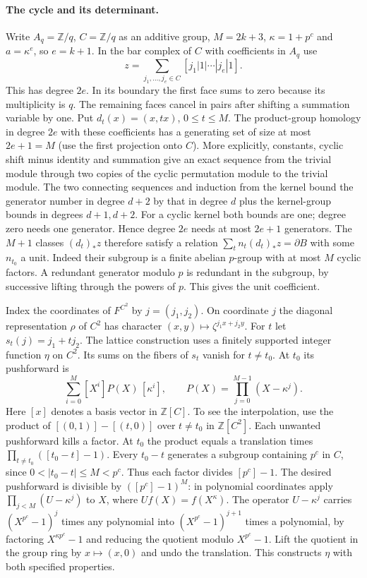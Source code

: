 \paragraph{The cycle and its determinant.}\label{kone:cycle}
Write $A_q=\mathbb Z/q$, $C=\mathbb Z/q$ as an additive group,
$M=2k+3$, $\kappa=1+p^c$ and $a=\kappa^e$, so $e=k+1$.
In the bar complex of $C$ with coefficients in $A_q$ use
\[
 z=\sum_{j_1,\ldots,j_e\in C}[j_1|1|\cdots|j_e|1].
\]
This has degree $2e$. In its boundary the first face sums to zero
because its multiplicity is $q$. The remaining faces cancel in pairs
after shifting a summation variable by one. Put $d_t(x)=(x,tx)$,
$0\le t\le M$. The product-group homology in degree $2e$ with these
coefficients has a generating set of size at most $2e+1=M$ (use the
first projection onto $C$). More explicitly, constants, cyclic
shift minus identity and summation give an exact sequence
from the trivial module through two copies of the cyclic permutation
module to the trivial module. The two connecting sequences and
induction from the kernel bound the generator number in degree $d+2$
by that in degree $d$ plus the kernel-group bounds in degrees $d+1,d+2$.
For a cyclic kernel both bounds are one; degree zero needs one
generator. Hence degree $2e$ needs at most $2e+1$ generators.
The $M+1$ classes $(d_t)_*z$
therefore satisfy a relation $\sum_t n_t(d_t)_*z=\partial B$ with
some $n_{t_0}$ a unit. Indeed their subgroup is a finite abelian
$p$-group with at most $M$ cyclic factors. A redundant generator
modulo $p$ is redundant in the subgroup, by successive lifting
through the powers of $p$. This gives the unit coefficient.

Index the coordinates of $F^{C^2}$ by $j=(j_1,j_2)$.
On coordinate $j$ the diagonal representation $\rho$ of $C^2$
has character $(x,y)\mapsto\zeta^{j_1x+j_2y}$. For $t$ let
$s_t(j)=j_1+tj_2$. The lattice construction uses a finitely supported
integer function $\eta$ on $C^2$. Its sums on the fibers of $s_t$
vanish for $t\ne t_0$. At $t_0$ its pushforward is
\[
 \sum_{i=0}^{M}[X^i]P(X)\,[\kappa^i],\qquad
 P(X)=\prod_{j=0}^{M-1}(X-\kappa^j).
\]
Here $[x]$ denotes a basis vector in $\mathbb Z[C]$. To see the
interpolation, use the product of $[(0,1)]-[(t,0)]$ over $t\ne t_0$
in $\mathbb Z[C^2]$. Each unwanted pushforward kills a factor. At
$t_0$ the product equals a translation times
$\prod_{t\ne t_0}([t_0-t]-1)$. Every $t_0-t$ generates a subgroup
containing $p^c$ in $C$, since $0<|t_0-t|\le M<p^c$. Thus each factor
divides $[p^c]-1$. The desired pushforward is divisible by
$([p^c]-1)^M$: in polynomial coordinates apply
$\prod_{j<M}(U-\kappa^j)$ to $X$, where $Uf(X)=f(X^\kappa)$.
The operator $U-\kappa^j$ carries $(X^{p^c}-1)^j$ times any polynomial
into $(X^{p^c}-1)^{j+1}$ times a polynomial, by factoring
$X^{\kappa p^c}-1$ and reducing the quotient modulo $X^{p^c}-1$.
Lift the quotient in the group ring by $x\mapsto(x,0)$ and undo the
translation. This constructs $\eta$ with both specified properties.

